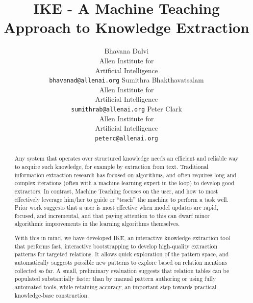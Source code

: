 \documentclass[11pt,letterpaper]{article}
\title{IKE - A Machine Teaching Approach to Knowledge Extraction}
\author{Bhavana Dalvi\\
	    Allen Institute for \\ Artificial Intelligence\\
	    {\tt bhavanad@allenai.org}
	  \And
	Sumithra Bhakthavatsalam\\
  	Allen Institute for \\ Artificial Intelligence\\
	    {\tt sumithrab@allenai.org} 
  \And
	Peter Clark\\
  	Allen Institute for \\ Artificial Intelligence\\
	    {\tt peterc@allenai.org}}
\date{}
\begin{document}
\maketitle

\begin{abstract}
Any system that operates over structured knowledge needs an efficient and reliable way to acquire such knowledge, for example by extraction from text. Traditional information extraction research has focused on algorithms, and often requires long and complex iterations (often with a machine learning expert in the loop) to develop good extractors. In contrast, Machine Teaching focuses on the user, and how to most effectively leverage him/her to guide or ``teach'' the machine to perform a task well. Prior work suggests that a user is most effective when model updates are rapid, focused, and incremental, and that paying attention to this can dwarf minor algorithmic improvements in the learning algorithms themselves.
 
With this in mind, we have developed IKE, an interactive knowledge extraction tool that performs fast, interactive bootstrapping to develop high-quality extraction patterns for targeted relations. It allows quick exploration of the pattern space, and automatically suggests possible new patterns to explore based on relation mentions collected so far. A small, preliminary evaluation suggests that relation tables can be populated substantially faster than by manual pattern authoring or using fully automated tools, while retaining accuracy, an important step towards practical knowledge-base construction.

\end{abstract}



\end{document}

